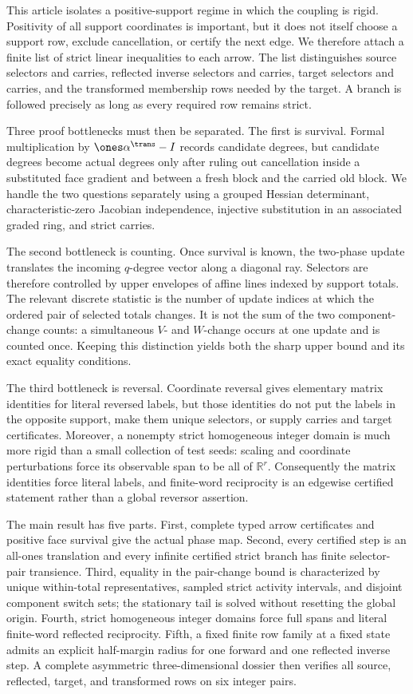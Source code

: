 \documentclass[11pt]{article}
\theoremstyle{definition}
\theoremstyle{remark}
\begin{document}
This article isolates a positive-support regime in which the coupling is
rigid.  Positivity of all support coordinates is important, but it does not
itself choose a support row, exclude cancellation, or certify the next
edge.  We therefore attach a finite list of strict linear inequalities to
each arrow.  The list distinguishes source selectors and carries,
reflected inverse selectors and carries, target selectors and carries, and
the transformed membership rows needed by the target.  A branch is followed
precisely as long as every required row remains strict.

Three proof bottlenecks must then be separated.  The first is survival.
Formal multiplication by \(\ones\alpha^{\trans}-I\) records candidate
degrees, but candidate degrees become actual degrees only after ruling out
cancellation inside a substituted face gradient and between a fresh block
and the carried old block.  We handle the two questions separately using a
grouped Hessian determinant, characteristic-zero Jacobian independence,
injective substitution in an associated graded ring, and strict carries.

The second bottleneck is counting.  Once survival is known, the two-phase
update translates the incoming \(q\)-degree vector along a diagonal ray.
Selectors are therefore controlled by upper envelopes of affine lines
indexed by support totals.  The relevant discrete statistic is the number
of update indices at which the ordered pair of selected totals changes.
It is not the sum of the two component-change counts: a simultaneous
\(V\)- and \(W\)-change occurs at one update and is counted once.  Keeping
this distinction yields both the sharp upper bound and its exact equality
conditions.

The third bottleneck is reversal.  Coordinate reversal gives elementary
matrix identities for literal reversed labels, but those identities do not
put the labels in the opposite support, make them unique selectors, or
supply carries and target certificates.  Moreover, a nonempty strict
homogeneous integer domain is much more rigid than a small collection of
test seeds: scaling and coordinate perturbations force its observable
span to be all of \(\mathbb R^r\).  Consequently the matrix identities force
literal labels, and finite-word reciprocity is an edgewise certified
statement rather than a global reversor assertion.

The main result has five parts.  First, complete typed arrow certificates
and positive face survival give the actual phase map.  Second, every
certified step is an all-ones translation and every infinite certified
strict branch has finite selector-pair transience.  Third, equality in the
pair-change bound is characterized by unique within-total representatives,
sampled strict activity intervals, and disjoint component switch sets; the
stationary tail is solved without resetting the global origin.  Fourth,
strict homogeneous integer domains force full spans and literal
finite-word reflected reciprocity.  Fifth, a fixed finite row family at a
fixed state admits an explicit half-margin radius for one forward and one
reflected inverse step.  A complete asymmetric three-dimensional dossier
then verifies all source, reflected, target, and transformed rows on six
integer pairs.
\end{document}
